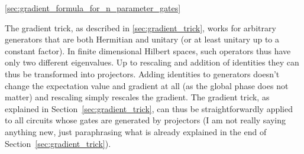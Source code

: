\documentclass[aps,pra,10pt,twocolumn,groupedaddress,nofootinbib]{revtex4-1}
\theoremstyle{plain}
\begin{document}
\ref{sec:gradient_formula_for_n_parameter_gates}

The gradient trick, as described in \ref{sec:gradient_trick}, works for arbitrary generators that are both Hermitian and unitary (or at least unitary up to a constant factor).
In finite dimensional Hilbert spaces, such operators thus have only two different eigenvalues.
Up to rescaling and addition of identities they can thus be transformed into projectors.
Adding identities to generators doesn't change the expectation value and gradient at all (as the global phase does not matter) and rescaling simply rescales the gradient.
The gradient trick, as explained in Section~\ref{sec:gradient_trick}, can thus be straightforwardly applied to all circuits whose gates are generated by projectors (I am not really saying anything new, just paraphrasing what is already explained in the end of Section~\ref{sec:gradient_trick}).
\end{document}
